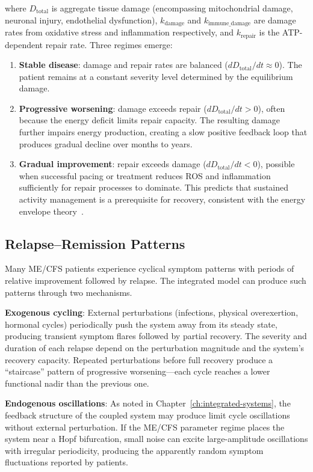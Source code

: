 where $D_{\text{total}}$ is aggregate tissue damage (encompassing mitochondrial damage, neuronal injury, endothelial dysfunction), $k_{\text{damage}}$ and $k_{\text{immune\_damage}}$ are damage rates from oxidative stress and inflammation respectively, and $k_{\text{repair}}$ is the ATP-dependent repair rate. Three regimes emerge:

\begin{enumerate}
    \item \textbf{Stable disease}: damage and repair rates are balanced ($dD_{\text{total}}/dt \approx 0$). The patient remains at a constant severity level determined by the equilibrium damage.
    \item \textbf{Progressive worsening}: damage exceeds repair ($dD_{\text{total}}/dt > 0$), often because the energy deficit limits repair capacity. The resulting damage further impairs energy production, creating a slow positive feedback loop that produces gradual decline over months to years.
    \item \textbf{Gradual improvement}: repair exceeds damage ($dD_{\text{total}}/dt < 0$), possible when successful pacing or treatment reduces ROS and inflammation sufficiently for repair processes to dominate. This predicts that sustained activity management is a prerequisite for recovery, consistent with the energy envelope theory~\cite{jason2012energy}.
\end{enumerate}

\subsection{Relapse--Remission Patterns}
\label{sec:relapse-remission}

Many ME/CFS patients experience cyclical symptom patterns with periods of relative improvement followed by relapse. The integrated model can produce such patterns through two mechanisms.

\textbf{Exogenous cycling}: External perturbations (infections, physical overexertion, hormonal cycles) periodically push the system away from its steady state, producing transient symptom flares followed by partial recovery. The severity and duration of each relapse depend on the perturbation magnitude and the system's recovery capacity. Repeated perturbations before full recovery produce a ``staircase'' pattern of progressive worsening---each cycle reaches a lower functional nadir than the previous one.

\textbf{Endogenous oscillations}: As noted in Chapter~\ref{ch:integrated-systems}, the feedback structure of the coupled system may produce limit cycle oscillations without external perturbation. If the ME/CFS parameter regime places the system near a Hopf bifurcation, small noise can excite large-amplitude oscillations with irregular periodicity, producing the apparently random symptom fluctuations reported by patients.

